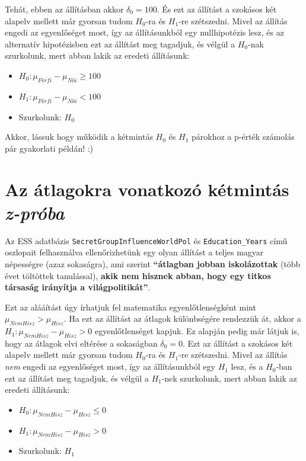 \documentclass[
]{book}
\providecommand{\tightlist}{%
  \setlength{\itemsep}{0pt}\setlength{\parskip}{0pt}}
\begin{document}
Tehát, ebben az állításban akkor \(\delta_0=100\). És ezt az állítást a szokásos két alapelv mellett már gyorsan tudom \(H_0\)-ra és \(H_1\)-re szétszedni. Mivel az állítás engedi az egyenlőséget most, így az állításunkból egy nullhipotézis lesz, és az alternatív hipotézisben ezt az állítást meg tagadjuk, és vélgül a \(H_0\)-nak szurkolunk, mert abban lakik az eredeti állításunk:

\begin{itemize}
\tightlist
\item
  \(H_0:\mu_{Férfi} - \mu_{Női} \geq 100\)
\item
  \(H_1:\mu_{Férfi} - \mu_{Női} < 100\)
\item
  Szurkolunk: \(H_0\)
\end{itemize}

Akkor, lássuk hogy működik a kétmintás \(H_0\) és \(H_1\) párokhoz a p-érték számolás pár gyakorlati példán! :)

\section{\texorpdfstring{Az átlagokra vonatkozó kétmintás \emph{z-próba}}{Az átlagokra vonatkozó kétmintás z-próba}}\label{az-uxe1tlagokra-vonatkozuxf3-kuxe9tmintuxe1s-z-pruxf3ba}

Az ESS adatbázis \texttt{SecretGroupInfluenceWorldPol} és \texttt{Education\_Years} című oszlopait felhasználva ellenőrizhetünk egy olyan állítást a teljes magyar népességre (azaz sokaságra), ami szerint \textbf{``átlagban jobban iskolázottak} (több évet töltöttek tanulással), \textbf{akik nem hisznek abban, hogy egy titkos társaság irányítja a világpolitikát''}.

Ezt az alááítást úgy írhatjuk fel matematika egyenlőtlenségként mint \(\mu_{NemHisz} > \mu_{Hisz}\). Ha ezt az állítást az átlagok különbségére rendezzük át, akkor a \(H_1:\mu_{NemHisz} - \mu_{Hisz} > 0\) egyenlőtlenséget kapjuk. Ez alapján pedig már látjuk is, hogy az átlagok elvi eltérése a sokaságban \(\delta_0=0\).
Ezt az állítást a szokásos két alapelv mellett már gyorsan tudom \(H_0\)-ra és \(H_1\)-re szétszedni. Mivel az állítás \emph{nem} engedi az egyenlőséget most, így az állításunkból egy \(H_1\) lesz, és a \(H_0\)-ban ezt az állítást meg tagadjuk, és vélgül a \(H_1\)-nek szurkolunk, mert abban lakik az eredeti állításunk:

\begin{itemize}
\tightlist
\item
  \(H_0:\mu_{NemHisz} - \mu_{Hisz} \leq 0\)
\item
  \(H_1:\mu_{NemHisz} - \mu_{Hisz} > 0\)
\item
  Szurkolunk: \(H_1\)
\end{itemize}
\end{document}
